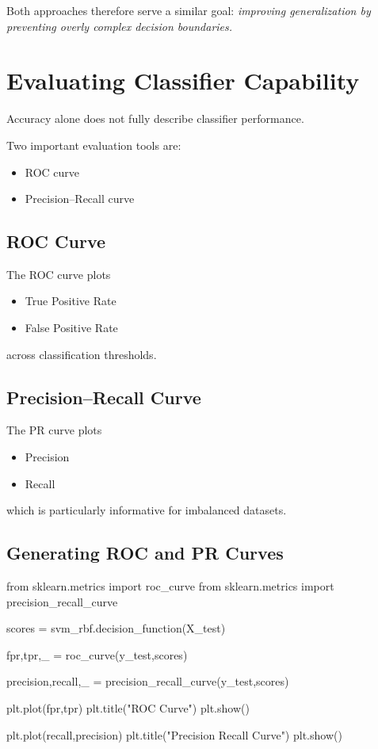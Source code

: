 \documentclass[12pt]{article}
\begin{document}
Both approaches therefore serve a similar goal:  
\emph{improving generalization by preventing overly complex decision boundaries.}
\section{Evaluating Classifier Capability}

Accuracy alone does not fully describe classifier performance.

Two important evaluation tools are:

\begin{itemize}
\item ROC curve
\item Precision–Recall curve
\end{itemize}



\subsection{ROC Curve}

The ROC curve plots

\begin{itemize}
\item True Positive Rate
\item False Positive Rate
\end{itemize}

across classification thresholds.

\subsection{Precision–Recall Curve}

The PR curve plots

\begin{itemize}
\item Precision
\item Recall
\end{itemize}

which is particularly informative for imbalanced datasets.

\subsection{Generating ROC and PR Curves}

\begin{py-box}
from sklearn.metrics import roc_curve
from sklearn.metrics import precision_recall_curve

scores = svm_rbf.decision_function(X_test)

fpr,tpr,_ = roc_curve(y_test,scores)

precision,recall,_ = precision_recall_curve(y_test,scores)

plt.plot(fpr,tpr)
plt.title("ROC Curve")
plt.show()

plt.plot(recall,precision)
plt.title("Precision Recall Curve")
plt.show()
\end{py-box}
\end{document}
